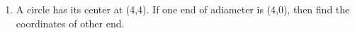 \begin{enumerate}
\item A circle has its center at (4,4). If one end of adiameter is (4,0), then find the coordinates of other end.
\end{enumerate}
